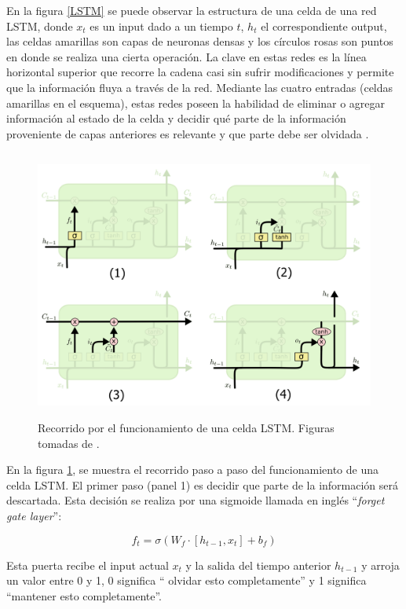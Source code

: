 En la figura \ref{LSTM} se puede observar la estructura de una celda de una red LSTM, donde $x_t$ es un input 
dado a un tiempo $t$, $h_t$ el correspondiente output, las celdas amarillas son 
capas de neuronas densas y los círculos rosas son puntos en donde se realiza una cierta operación. La clave en estas
redes es la línea horizontal superior que recorre la cadena casi sin sufrir modificaciones y permite que la información
fluya a través de la red. Mediante las cuatro entradas (celdas amarillas en el esquema),
estas redes poseen la habilidad de eliminar o agregar información al estado de la celda y decidir qué parte de la información
proveniente de capas anteriores es relevante y que parte debe ser olvidada \cite{olah}. 

\begin{figure}[h!]
  \begin{center}
    \includegraphics[height=3.5in]{Figures/LSTMs.png}
    \caption{ Recorrido por el funcionamiento de una celda LSTM. Figuras tomadas de \cite{olah}. }
    \label{LSTMrec}
  \end{center}
\end{figure}

En la figura \ref{LSTMrec}, se muestra el recorrido paso a paso del funcionamiento de una celda LSTM. 
El primer paso (panel 1) es decidir 
que parte de la información será descartada. Esta decisión se realiza por una sigmoide llamada en inglés ``\textit{forget gate layer}'':

\begin{equation}
  f_t = \sigma(W_f\cdot[h_{t-1},x_t]+b_f)
\end{equation}

Esta puerta recibe el input actual $x_t$ y la salida del tiempo anterior $h_{t-1}$ y arroja un valor entre 0 y 1, 0 significa
 `` olvidar esto completamente''  y 1 significa ``mantener esto completamente''. 

